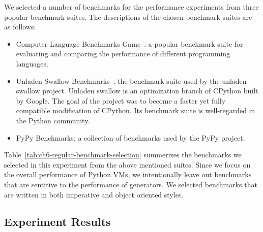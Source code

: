 We selected a number of benchmarks for the performance experiments from three popular benchmark suites.
The descriptions of the chosen benchmark suites are as follows:

\begin{itemize}

\item Computer Language Benchmarks Game~\cite{benchmarkgame}: a popular benchmark suite for evaluating and comparing the performance of different programming languages.

\item Unladen Swallow Benchmarks~\cite{unladen.swallow}: the benchmark suite used by the unladen swallow project.
Unladen swallow is an optimization branch of CPython built by Google.
The goal of the project was to become a faster yet fully compatible modification of CPython.
Its benchmark suite is well-regarded in the Python community.

\item PyPy Benchmarks: a collection of benchmarks used by the PyPy project.

\end{itemize}

Table~\ref{tab:ch6-regular-benchmark-selection} summerizes the benchmarks we selected in this experiment from the above mentioned suites.
Since we focus on the overall performance of Python VMs, we intentionally leave out benchmarks that are sentitive to the performance of generators.
We selected benchmarks that are written in both imperative and object oriented styles.

\subsection{Experiment Results}

